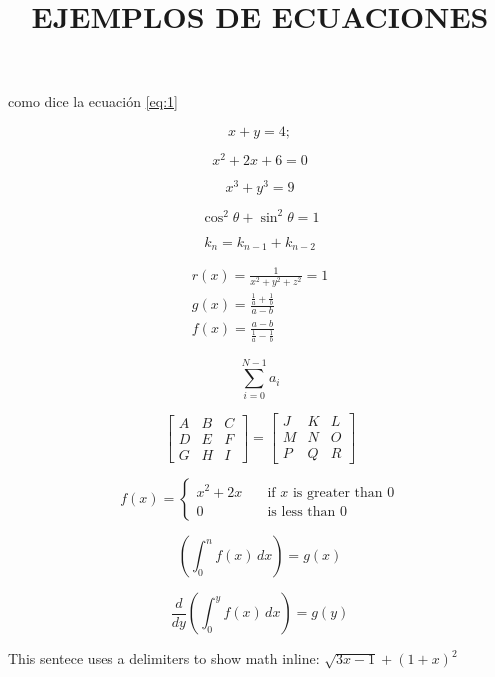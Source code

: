\documentclass{article}
\title{EJEMPLOS DE ECUACIONES}
\begin{document}
\maketitle
 
como dice la ecuación \ref{eq:1}

     \begin{equation}
     \label{eq:1}
        x+y=4;   
     \end{equation}
     
     \begin{equation}
     \label{eq:2}
        x^2+2x+6=0 
     \end{equation}

     \begin{equation}
         x^3+y^3=9
     \end{equation}

     \begin{equation}
         \cos^2\theta+\sin^2\theta=1
     \end{equation}

     \begin{equation}
         k_n=k_{n-1}+k_{n-2}
     \end{equation}

     \begin{align*}
         r(x)=\frac{1}{x^2+y^2+z^2}=1  \\
         g(x)=\frac{\frac{1}{a}+\frac{1}{b}}{a-b} \\
         f(x)=\frac{a-b}{\frac{1}{a}-\frac{1}{b}}
     \end{align*}

     \begin{equation}
         \sum_{i=0}^{N-1}a_i
     \end{equation}



\begin{equation}
    \begin{bmatrix}
        A&B&C\\
        D&E&F\\
        G&H&I
    \end{bmatrix}
=
    \begin{bmatrix}
        J&K&L\\
        M&N&O\\
        P&Q&R
    \end{bmatrix}
\end{equation}

\begin{equation}
    f(x)=
    \begin{cases}
        x^2+2x   &\quad \text{if } x \text{ is greater than 0}\\
        0        &\quad \text{is less than 0}
    \end{cases}
\end{equation}

\begin{equation}
    \left(\int_{0}^{n}f(x)\,dx \right)=g(x)
\end{equation}

\begin{equation}
   \frac{d}{dy}\left(\int_{0}^{y}f(x)\,dx\right)=g(y)
\end{equation}

This sentece uses a delimiters to show math inline: $\sqrt{3x-1}+(1+x)^2$
     
\end{document}

